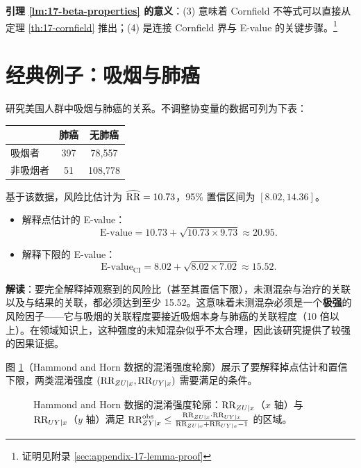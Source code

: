 \textbf{引理 \ref{lm:17-beta-properties} 的意义}：(3) 意味着 Cornfield 不等式可以直接从定理 \ref{th:17-cornfield} 推出；(4) 是连接 Cornfield 界与 E-value 的关键步骤。\footnote{证明见附录 \cref{sec:appendix-17-lemma-proof}}

\section{经典例子：吸烟与肺癌}\label{sec:17-smoking-lung-cancer}

\begin{Example}\label{ex:17-smoking-lung-cancer}
研究美国人群中吸烟与肺癌的关系。不调整协变量的数据可列为下表：

\begin{center}
\begin{tabular}{lcc}
\toprule
           & 肺癌 & 无肺癌 \\ \midrule
吸烟者      & 397  & 78,557 \\
非吸烟者    & 51   & 108,778 \\ \bottomrule
\end{tabular}
\end{center}

基于该数据，风险比估计为 $\widehat{\text{RR}} = 10.73$，95\% 置信区间为 $[8.02, 14.36]$。

\begin{itemize}
  \item 解释点估计的 E-value：
    \[
    \mathrm{E\text{-}value} = 10.73 + \sqrt{10.73 \times 9.73} \approx 20.95 .
    \]
  \item 解释下限的 E-value：
    \[
    \mathrm{E\text{-}value}_{\mathrm{CI}} = 8.02 + \sqrt{8.02 \times 7.02} \approx 15.52 .
    \]
\end{itemize}

\textbf{解读}：要完全解释掉观察到的风险比（甚至其置信下限），未测混杂与治疗的关联以及与结果的关联，都必须达到至少 15.52。这意味着未测混杂必须是一个\textbf{极强}的风险因子——它与吸烟的关联程度要接近吸烟本身与肺癌的关联程度（10 倍以上）。在领域知识上，这种强度的未知混杂似乎不太合理，因此该研究提供了较强的因果证据。
\end{Example}

图 \ref{fig:17-confounding-contour}（Hammond and Horn 数据的混淆强度轮廓）展示了要解释掉点估计和置信下限，两类混淆强度 $(\text{RR}_{ZU\mid x}, \text{RR}_{UY\mid x})$ 需要满足的条件。

\begin{figure}[ht]
\centering
\caption{Hammond and Horn 数据的混淆强度轮廓：$\text{RR}_{ZU\mid x}$（$x$ 轴）与 $\text{RR}_{UY\mid x}$（$y$ 轴）满足 $\text{RR}_{ZY\mid x}^{\mathrm{obs}} \leq \frac{\text{RR}_{ZU\mid x} \cdot \text{RR}_{UY\mid x}}{\text{RR}_{ZU\mid x} + \text{RR}_{UY\mid x} - 1}$ 的区域。}
\label{fig:17-confounding-contour}
\end{figure}


